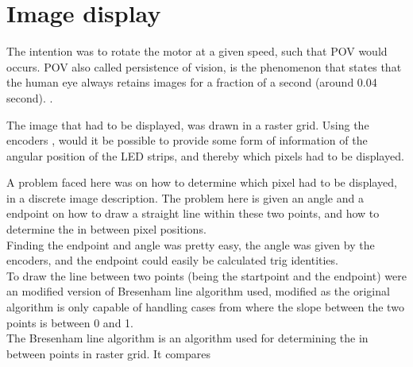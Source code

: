 \section{Image display}
The intention was to rotate the motor at a given speed, such that POV would occurs. POV also called persistence of vision, is the phenomenon that states that the human eye  
always retains images for a fraction of a second (around 0.04 second). . 

The image that had to be displayed, was drawn in a raster grid. Using the encoders , would it be  possible to provide some form of information of the angular position of the LED strips, and thereby which pixels had to be displayed. 


A problem faced here was on how to determine which pixel had to be displayed, in a discrete image description. The problem here is given an angle and a endpoint on how to draw a straight line within these two points, and how to determine the in between pixel positions. \\
Finding the endpoint and angle was pretty easy, the angle was given by the encoders, and the endpoint could easily be calculated trig identities. \\

To draw the line between two points (being the startpoint and the endpoint) were an modified version of Bresenham line algorithm used,  modified as the original algorithm is only capable of handling cases from where the slope between the two points is between 0 and 1. \\

The Bresenham line algorithm is an algorithm used for determining the in between points in raster grid.  It compares 

